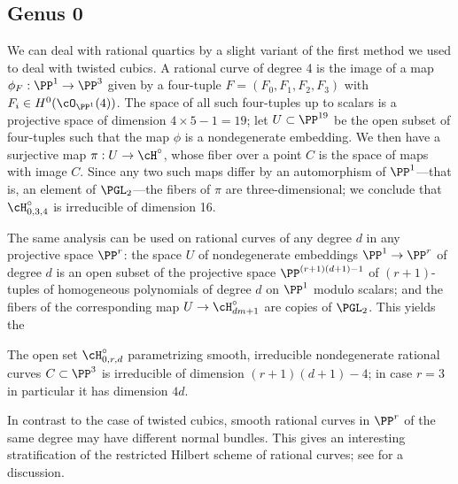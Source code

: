 \subsection{Genus 0}\label{degree 4 genus 0}

We can deal with rational quartics by a slight variant of the first method we used to deal with twisted cubics. A rational curve of degree 4 is the image of a map $\phi_F : \PP^1 \to \PP^3$ given by a four-tuple $F = (F_0,F_1,F_2,F_3)$ with $F_i \in H^0(\cO_{\PP^1}(4))$. The space of all such four-tuples up to scalars is a projective space of dimension $4 \times 5 - 1 = 19$; let $U \subset \PP^{19}$ be the open subset of four-tuples such that the map $\phi$ is a nondegenerate embedding. We then have a surjective map $\pi : U \to \cH^\circ$, whose fiber over a point $C$ is the space of maps with image $C$. Since any two such maps differ by an automorphism of $\PP^1$---that is, an element of $\PGL_2$---the fibers of $\pi$ are three-dimensional; we conclude that $\cH^\circ_{0,3,4}$ is irreducible of dimension 16. 

The same analysis can be used on rational curves of any degree $d$ in any projective space $\PP^r$: the space $U$ of nondegenerate embeddings $\PP^1 \to \PP^r$ of degree $d$ is an open subset of the projective space $\PP^{(r+1)(d+1)-1}$ of $(r+1)$-tuples of homogeneous polynomials of degree $d$ on $\PP^1$ modulo scalars; and the fibers of the corresponding map $U \to \cH^\circ_{dm+1}$ are copies of $\PGL_2$. This yields the

\begin{proposition}\label{dimension of rational curves}
The open set $\cH^\circ_{0,r,d}$ parametrizing smooth, irreducible nondegenerate rational curves $C \subset \PP^3$ is irreducible of dimension $(r+1)(d+1)-4$; in case $r=3$ in particular it has dimension $4d$.
\end{proposition}

In contrast to the case of twisted cubics, smooth rational curves in $\PP^r$ of the same degree may have different normal bundles. This gives an interesting stratification of the restricted Hilbert scheme of rational curves; see \cite{MR3778979} for a discussion.

